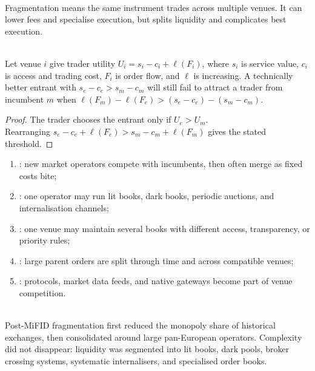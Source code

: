 \documentclass[a4paper,oneside,openany]{book}
\begin{document}
\begin{mechanism} \\
Fragmentation means the same instrument trades across multiple venues. It can lower fees and specialise execution, but splits liquidity and complicates best execution.
\end{mechanism}

\begin{proposition} \\
Let venue $i$ give trader utility $U_i=s_i-c_i+\ell(F_i)$, where $s_i$ is service value, $c_i$ is access and trading cost, $F_i$ is order flow, and $\ell$ is increasing. A technically better entrant with $s_e-c_e>s_m-c_m$ will still fail to attract a trader from incumbent $m$ when $\ell(F_m)-\ell(F_e)> (s_e-c_e)-(s_m-c_m)$.
\begin{proof}
The trader chooses the entrant only if $U_e>U_m$.\\
Rearranging $s_e-c_e+\ell(F_e)>s_m-c_m+\ell(F_m)$ gives the stated threshold.
\end{proof}
\end{proposition}

\begin{taxonomy} 
\begin{enumerate}[label=\roman*.]
\setlength{\itemsep}{0pt}
\item {}: new market operators compete with incumbents, then often merge as fixed costs bite;
\item {}: one operator may run lit books, dark books, periodic auctions, and internalisation channels;
\item {}: one venue may maintain several books with different access, transparency, or priority rules;
\item {}: large parent orders are split through time and across compatible venues;
\item {}: protocols, market data feeds, and native gateways become part of venue competition.
\end{enumerate}
\end{taxonomy}

\begin{mechanism} \\
Post-MiFID fragmentation first reduced the monopoly share of historical exchanges, then consolidated around large pan-European operators. Complexity did not disappear: liquidity was segmented into lit books, dark pools, broker crossing systems, systematic internalisers, and specialised order books.
\end{mechanism}
\end{document}
